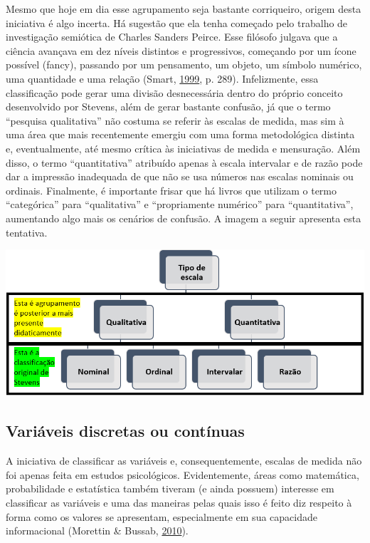 \documentclass[
]{book}
\begin{document}
Mesmo que hoje em dia esse agrupamento seja bastante corriqueiro, origem
desta iniciativa é algo incerta. Há sugestão que ela tenha começado pelo
trabalho de investigação semiótica de Charles Sanders Peirce. Esse
filósofo julgava que a ciência avançava em dez níveis distintos e
progressivos, começando por um ícone possível (fancy), passando por um
pensamento, um objeto, um símbolo numérico, uma quantidade e uma relação
(Smart, \protect\hyperlink{ref-smart1999}{1999}, p. 289). Infelizmente,
essa classificação pode gerar uma divisão desnecessária dentro do
próprio conceito desenvolvido por Stevens, além de gerar bastante
confusão, já que o termo ``pesquisa qualitativa'' não costuma se referir
às escalas de medida, mas sim à uma área que mais recentemente emergiu
com uma forma metodológica distinta e, eventualmente, até mesmo crítica
às iniciativas de medida e mensuração. Além disso, o termo
``quantitativa'' atribuído apenas à escala intervalar e de razão pode
dar a impressão inadequada de que não se usa números nas escalas
nominais ou ordinais. Finalmente, é importante frisar que há livros que
utilizam o termo ``categórica'' para ``qualitativa'' e ``propriamente
numérico'' para ``quantitativa'', aumentando algo mais os cenários de
confusão. A imagem a seguir apresenta esta tentativa.

\includegraphics{./img/cap_escala_medida_agrupamento.png}

\hypertarget{variuxe1veis-discretas-ou-contuxednuas}{%
\subsection{Variáveis discretas ou
contínuas}\label{variuxe1veis-discretas-ou-contuxednuas}}

A iniciativa de classificar as variáveis e, consequentemente, escalas de
medida não foi apenas feita em estudos psicológicos. Evidentemente,
áreas como matemática, probabilidade e estatística também tiveram (e
ainda possuem) interesse em classificar as variáveis e uma das maneiras
pelas quais isso é feito diz respeito à forma como os valores se
apresentam, especialmente em sua capacidade informacional (Morettin \&
Bussab, \protect\hyperlink{ref-morettin_bussab_2010}{2010}).
\end{document}
